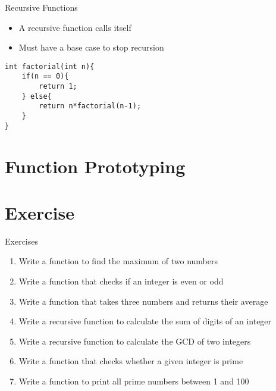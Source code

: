 \documentclass[12pt, aspectratio=169]{beamer}
\begin{document}




    \begin{frame}[fragile]{Recursive Functions}
        \begin{itemize}
            \item A recursive function calls itself
            \item Must have a base case to stop recursion
        \end{itemize}

        \begin{verbatim}
int factorial(int n){
    if(n == 0){
        return 1;
    } else{
        return n*factorial(n-1);
    }
}
        \end{verbatim}
    \end{frame}


    \section{Function Prototyping}


    \section{Exercise}

    \begin{frame}{Exercises}
        \begin{enumerate}
            \item Write a function to find the maximum of two numbers
            \item Write a function that checks if an integer is even or odd
            \item Write a function that takes three numbers and returns their average
            \item Write a recursive function to calculate the sum of digits of an integer
            \item Write a recursive function to calculate the GCD of two integers
            \item Write a function that checks whether a given integer is prime
            \item Write a function to print all prime numbers between 1 and 100
        \end{enumerate}
    \end{frame}
\end{document}
